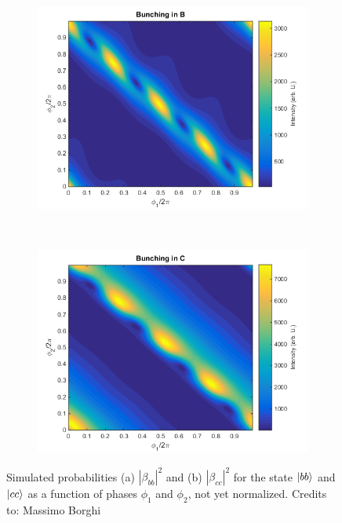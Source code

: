 \begin{figure}
\centering
\begin{subfigure}{0.49\textwidth}
\centering
\includegraphics[width = \textwidth]{img/Bunching_B}
\caption{}
\end{subfigure}\,
\begin{subfigure}{0.49\textwidth}
\includegraphics[width = \textwidth]{img/Bunching_C}
\caption{}
\end{subfigure}
\caption{Simulated probabilities (a) $|\beta_{bb}|^2$ and (b) $|\beta_{cc}|^2$ for the state $\ket{bb}$ and $\ket{cc}$ as a function of phases $\phi_1$ and $\phi_2$, not yet normalized. Credits to: Massimo Borghi}\label{bounchstates}
\end{figure}

